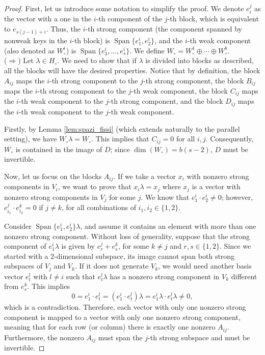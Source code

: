 \documentclass[runningheads,a4paper,english]{llncs}
\DeclareMathOperator{\spn}{Span}
\newcommand{\wo}{W_\circ}
\newcommand{\ho}{H_\circ}
\begin{document}
\begin{proof}
First, let us introduce some notation to simplify the proof. We denote \( e_i^j \) as the vector with a one in the \( i \)-th component of the \( j \)-th block, which is equivalent to \( e_{s(j-1) + i} \). Thus, the \( i \)-th strong component (the component spanned by nonweak keys in the \( i \)-th block) is \( \spn\{ e^i_1, e^i_2 \} \), and the \( i \)-th weak component (also denoted as \( \wo^i \)) is \( \spn\{ e^i_3, \dots, e^i_s \} \). We define \( \wo = \wo^1 \oplus \cdots \oplus \wo^b \).\\

\noindent (\(\Rightarrow\)) Let \( \lambda \in \ho \). We need to show that if \( \lambda \) is divided into blocks as described, all the blocks will have the desired properties. Notice that by definition, the block \( A_{ij} \) maps the \( i \)-th strong component to the \( j \)-th strong component, the block \( B_{ij} \) maps the \( i \)-th strong component to the \( j \)-th weak component, the block \( C_{ij} \) maps the \( i \)-th weak component to the \( j \)-th strong component, and the block \( D_{ij} \) maps the \( i \)-th weak component to the \( j \)-th weak component.

Firstly, by Lemma \ref{lem:spazi_fissi} (which extends naturally to the parallel setting), we have \( \wo \lambda = \wo \). This implies that \( C_{ij} = 0 \) for all \( i, j \). Consequently, \( \wo \) is contained in the image of \( D \); since \( \dim(\wo) = b(s-2) \), \( D \) must be invertible.

Now, let us focus on the blocks \( A_{ij} \). If we take a vector \( x_i \) with nonzero strong components in \( V_i \), we want to prove that \( x_i \lambda = x_j \) where \( x_j \) is a vector with nonzero strong components in \( V_j \) for some \( j \). We know that \( e^i_1 \cdot e^i_2 \neq 0 \); however, \( e^j_{i_1} \cdot e^k_{i_2} = 0 \) if \( j \neq k \), for all combinations of \( i_1, i_2 \in \{1, 2\} \).

Consider \( \spn \{e^i_1, e^i_2 \} \lambda \), and assume it contains an element with more than one nonzero strong component. Without loss of generality, suppose that the strong component of \( e_1^i \lambda\) is given by \(e^j_{r} + e^k_s \),  for some $k\ne j$ and \(r,s\in\{1,2\}\). Since we started with a 2-dimensional subspace, its image cannot span both strong subspaces of \( V_j \) and \( V_k \). If it does not generate \( V_k \), we would need another basis vector \( e^l_t \) with \( l \neq i \) such that \( e^l_t \lambda \) has a nonzero strong component in \( V_k \) different from \(e^k_s \). This implies
\[
0 = e_1^i \cdot e^l_t = (e_1^i \cdot e^l_t) \lambda = e_1^i \lambda \cdot e^l_t \lambda \neq 0,
\]
which is a contradiction. Therefore, each vector with only one nonzero strong component is mapped to a vector with only one nonzero strong component, meaning that for each row (or column) there is exactly one nonzero \( A_{ij} \). Furthermore, the nonzero \( A_{ij} \) must span the \( j \)-th strong subspace and must be invertible.


\end{proof}
\end{document}
